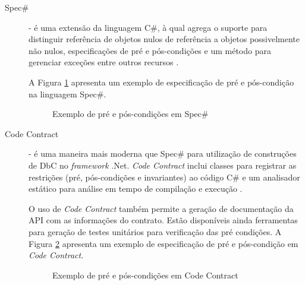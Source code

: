 \begin{description}
\vspace{8mm}

\item[Spec\#] - é uma extensão da linguagem C\#, à qual agrega o suporte para
distinguir referência de objetos nulos de referência a objetos possivelmente não
nulos, especificações de pré e pós-condições e um método para gerenciar
exceções entre outros recursos \cite{barnett2004spec}.

A Figura \ref{lst:exemploSpec} apresenta um exemplo de especificação de pré e
pós-condição na linguagem Spec\#.

\vspace{6mm}

\begin{figure}[h]
\begin{small}

\vspace{-.5cm}
\end{small}
\caption{Exemplo de pré e pós-condições em Spec\#}
\label{lst:exemploSpec}
\end{figure}

\vspace{8mm}

\item [Code Contract] - é uma maneira mais moderna que Spec\# para utilização de
construções de DbC no \textit{framework} .Net. \textit{Code Contract} inclui
classes para registrar as restrições (pré, pós-condições e invariantes) ao
código C\# e um analisador estático para análise em tempo de compilação e
execução \cite{codecontractSite}. 

O uso de \textit{Code Contract} também permite a geração de documentação da API
com as informações do contrato. Estão disponíveis ainda ferramentas para geração
de testes unitários para verificação das pré condições. A Figura \ref{lst:exemploCodeContract}
apresenta um exemplo de especificação de pré e pós-condição em \textit{Code
Contract}.

\vspace{6mm}

\begin{figure}[h]
\begin{small}

\vspace{-.5cm}
\end{small}
\caption{Exemplo de pré e pós-condições em Code Contract}
\label{lst:exemploCodeContract}
\end{figure}

\end{description}





 

